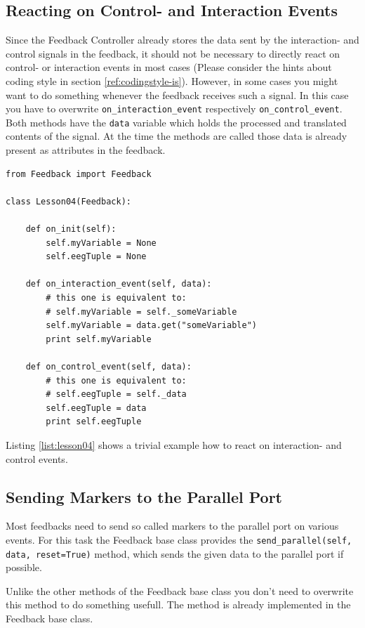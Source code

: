 \subsection{Reacting on Control- and Interaction Events}
Since the Feedback Controller already stores the data sent by the interaction- and control signals in the feedback, it should not be necessary to directly react on control- or interaction events in most cases (Please consider the hints about coding style in section \ref{ref:codingstyle-is}). However, in some cases you might want to do something whenever the feedback receives such a signal. In this case you have to overwrite \lstinline+on_interaction_event+ respectively \lstinline+on_control_event+. Both methods have the \lstinline+data+ variable which holds the processed and translated contents of the signal. At the time the methods are called those data is already present as attributes in the feedback.

\begin{lstlisting}[caption=Reacting on control- and interaction events., label={list:lesson04}]
from Feedback import Feedback

class Lesson04(Feedback):
    
    def on_init(self):
        self.myVariable = None
        self.eegTuple = None
    
    def on_interaction_event(self, data):
        # this one is equivalent to:
        # self.myVariable = self._someVariable
        self.myVariable = data.get("someVariable")
        print self.myVariable
        
    def on_control_event(self, data):
        # this one is equivalent to:
        # self.eegTuple = self._data
        self.eegTuple = data
        print self.eegTuple
\end{lstlisting}

Listing \ref{list:lesson04} shows a trivial example how to react on interaction- and control events. 

\subsection{Sending Markers to the Parallel Port}
Most feedbacks need to send so called markers to the parallel port on various events. For this task the Feedback base class provides the \lstinline+send_parallel(self, data, reset=True)+ method, which sends the given data to the parallel port if possible.

Unlike the other methods of the Feedback base class you don't need to overwrite this method to do something usefull. The method is already implemented in the Feedback base class.

